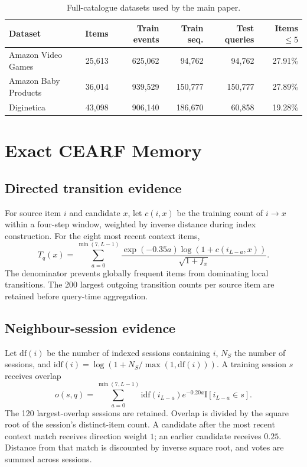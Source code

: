 \documentclass[runningheads]{llncs}
\begin{document}
\begin{table}[t]
\caption{Full-catalogue datasets used by the main paper.}
\centering
\begin{tabular}{lrrrrr}
\toprule
Dataset & Items & Train events & Train seq. & Test queries & Items $\leq5$\\
\midrule
Amazon Video Games & 25,613 & 625,062 & 94,762 & 94,762 & 27.91\%\\
Amazon Baby Products & 36,014 & 939,529 & 150,777 & 150,777 & 27.89\%\\
Diginetica & 43,098 & 906,140 & 186,670 & 60,858 & 19.28\%\\
\bottomrule
\end{tabular}
\end{table}

\section{Exact CEARF Memory}
\subsection{Directed transition evidence}
For source item $i$ and candidate $x$, let $c(i,x)$ be the training count of
$i\!\rightarrow\!x$ within a four-step window, weighted by inverse distance
during index construction. For the eight most recent context items,
\[
T_q(x)=\sum_{a=0}^{\min(7,L-1)}
\frac{\exp(-0.35a)\log(1+c(i_{L-a},x))}
     {\sqrt{1+f_x}}.
\]
The denominator prevents globally frequent items from dominating local
transitions. The 200 largest outgoing transition counts per source item are
retained before query-time aggregation.

\subsection{Neighbour-session evidence}
Let $\mathrm{df}(i)$ be the number of indexed sessions containing $i$,
$N_S$ the number of sessions, and
$\mathrm{idf}(i)=\log(1+N_S/\max(1,\mathrm{df}(i)))$. A training
session $s$ receives overlap
\[
o(s,q)=\sum_{a=0}^{\min(7,L-1)}
\mathrm{idf}(i_{L-a})e^{-0.20a}\mathrm{I}[i_{L-a}\in s].
\]
The 120 largest-overlap sessions are retained. Overlap is divided by the
square root of the session's distinct-item count. A candidate after the most
recent context match receives direction weight $1$; an earlier candidate
receives $0.25$. Distance from that match is discounted by inverse square
root, and votes are summed across sessions.
\end{document}
